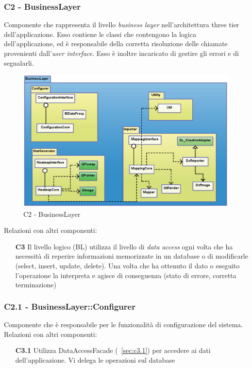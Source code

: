\subsubsection{C2 - BusinessLayer} \label{sec:c2}
Componente che rappresenta il livello \textit{business layer} nell'architettura three tier dell'applicazione. Esso contiene le classi che contengono la logica dell'applicazione, ed è responsabile della corretta risoluzione delle chiamate provenienti dall'\textit{user interface}. Esso è inoltre incaricato di gestire gli errori e di segnalarli.
\\
\begin{figure}[!h] 

        \centering 

        \includegraphics[scale=0.4]{./images/c2.png} 

        \caption{C2 - BusinessLayer} 

        \label{fig:c2}

        \end{figure} 

Relazioni con altri componenti: 
\begin{itemize} 
\item [\textbf{C3}]
Il livello logico (BL) utilizza il livello di \textit{data access} ogni volta che ha necessità di reperire informazioni memorizzate in un database o di modificarle (select, insert, update, delete). Una volta che ha ottenuto il dato o eseguito l'operazione la interpreta e agisce di conseguenza (stato di errore, corretta terminazione) 
\end{itemize} 

\subsubsection{C2.1 - BusinessLayer::Configurer} \label{sec:c2.1}
Componente che è responsabile per le funzionalità di configurazione del sistema.\\
Relazioni con altri componenti: 
\begin{itemize} 
\item [\textbf{C3.1}]
Utilizza DataAccessFacade (~\ref{sec:c3.1}) per accedere ai dati dell'applicazione. Vi delega le operazioni sul database 
\end{itemize} 

